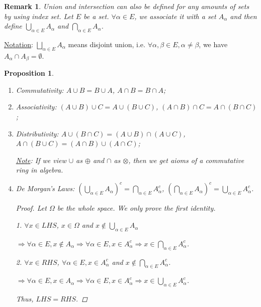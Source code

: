\documentclass[12pt]{article}
\theoremstyle{blueplain}
\newtheorem{proposition}[theorem]{Proposition}
\theoremstyle{bluedef}
\theoremstyle{blueremark}
\newtheorem{remark}{Remark}[section]
\numberwithin{equation}{section}
\begin{document}
\begin{remark}
  Union and intersection can also be defined for any amounts of sets by using index set. Let $E$ be a set. $\forall \alpha \in E$, we associate it with a set $A_{\alpha}$ and then define $\bigcup_{\alpha \in E} A_{\alpha}$ and $\bigcap_{\alpha \in E} A_{\alpha}$.
\end{remark}

\underline{Notation}: $\bigsqcup_{\alpha \in E} A_{\alpha}$ means disjoint union, i.e. $\forall \alpha, \beta \in E, \alpha \neq \beta$, we have $A_{\alpha} \cap A_{\beta} = \emptyset$.

\begin{proposition}
  \begin{enumerate}
    \item Commutativity: $A \cup B = B \cup A$, $A \cap B =B \cap A$;
    \item Associativity: $(A \cup B) \cup C = A \cup (B \cup C)$, $(A \cap B) \cap C = A \cap (B \cap C)$;
    \item Distributivity: $A \cup (B \cap C) = (A \cup B) \cap (A \cup C)$, $A \cap (B \cup C) = (A \cap B) \cup (A \cap C)$;

          \underline{Note}: If we view $\cup$ as $\oplus$ and $\cap$ as $\otimes$, then we get aioms of a commutative ring in algebra.

    \item De Morgan's Laws: $(\bigcup_{\alpha \in E} A_{\alpha})^c = \bigcap_{\alpha \in E} A_{\alpha}^c$, $(\bigcap_{\alpha \in E} A_{\alpha})^c = \bigcup_{\alpha \in E} A_{\alpha}^c$.
          \begin{proof}
            Let $\Omega$ be the whole space. We only prove the first identity.

            1. $\forall x \in LHS$, $x \in \Omega$ and $x \notin \bigcup_{\alpha \in E} A_{\alpha}$

            $\Rightarrow \forall \alpha \in E, x \notin A_{\alpha} \Rightarrow \forall \alpha \in E, x \in A_{\alpha}^c \Rightarrow x \in \bigcap_{\alpha \in E} A_{\alpha}^c$.

            2. $\forall x \in RHS$, $\forall \alpha \in E, x \in A_{\alpha}^c$ and $x \notin \bigcap_{\alpha \in E} A_{\alpha}^c$.

            $\Rightarrow \forall \alpha \in E, x \in A_{\alpha} \Rightarrow \forall \alpha \in E, x \in A_{\alpha}^c \Rightarrow x \in \bigcup_{\alpha \in E} A_{\alpha}^c$.

            Thus, $LHS = RHS$.
          \end{proof}
  \end{enumerate}
\end{proposition}
\end{document}

